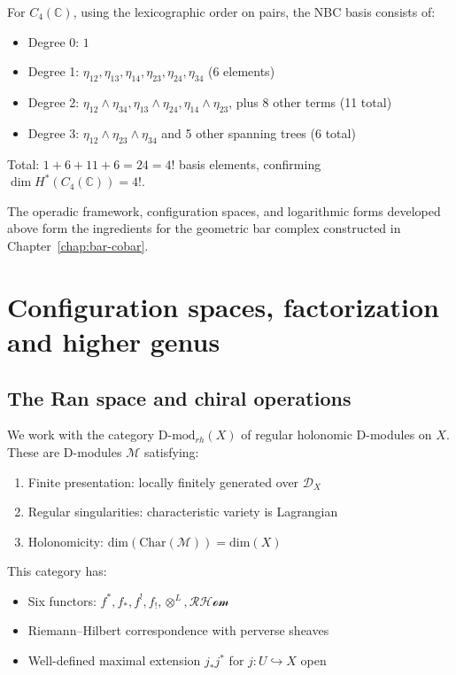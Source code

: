 \begin{example}[NBC basis for \texorpdfstring{$n = 4$}{n = 4}]\label{ex:NBC4}
For $C_4(\mathbb{C})$, using the lexicographic order on pairs, the NBC basis consists of:
\begin{itemize}
\item Degree 0: $1$
\item Degree 1: $\eta_{12}, \eta_{13}, \eta_{14}, \eta_{23}, \eta_{24}, \eta_{34}$ (6 elements)
\item Degree 2: $\eta_{12} \wedge \eta_{34}, \eta_{13} \wedge \eta_{24}, \eta_{14} \wedge \eta_{23}$, plus 8 other terms (11 total)
\item Degree 3: $\eta_{12} \wedge \eta_{23} \wedge \eta_{34}$ and 5 other spanning trees (6 total)
\end{itemize}
Total: $1 + 6 + 11 + 6 = 24 = 4!$ basis elements, confirming $\dim H^*(C_4(\mathbb{C})) = 4!$.
\end{example}
 
The operadic framework, configuration spaces, and logarithmic forms
developed above form the ingredients for the geometric bar complex
constructed in Chapter~\ref{chap:bar-cobar}.
 
\section{Configuration spaces, factorization and higher genus}
 
\subsection{The Ran space and chiral operations}

\begin{definition}
We work with the category $\text{D-mod}_{rh}(X)$ of regular holonomic D-modules on $X$. 
These are D-modules $\mathcal{M}$ satisfying:
\begin{enumerate}
\item Finite presentation: locally finitely generated over $\mathcal{D}_X$
\item Regular singularities: characteristic variety is Lagrangian
\item Holonomicity: $\text{dim}(\text{Char}(\mathcal{M})) = \text{dim}(X)$
\end{enumerate}
This category has:
\begin{itemize}
\item Six functors: $f^*, f_*, f^!, f_!, \otimes^L, \mathcal{RHom}$
\item Riemann--Hilbert correspondence with perverse sheaves
\item Well-defined maximal extension $j_*j^*$ for $j: U \hookrightarrow X$ open
\end{itemize}
\end{definition}

